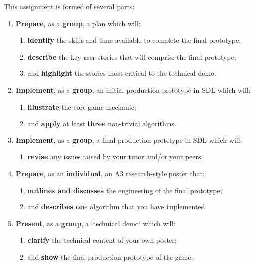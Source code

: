 \documentclass{../fal_assignment}
\begin{document}
This assignment is formed of several parts:

\begin{enumerate}[label=(\Alph*)]
    \item \textbf{Prepare}, as a \textbf{group}, a plan which will:
    	\begin{enumerate}[label=\roman*.]
    	    	\item \textbf{identify} the skills and time available to complete the final prototype;
    		\item \textbf{describe} the key user stories that will comprise the final prototype;
    		\item and \textbf{highlight} the stories most critical to the technical demo.
	\end{enumerate}
    \item \textbf{Implement}, as a \textbf{group}, an initial production prototype in SDL which will:
    	\begin{enumerate}[label=\roman*.]
    		\item \textbf{illustrate} the core game mechanic;
    		\item and \textbf{apply} at least \textbf{three} non-trivial algorithms.
	\end{enumerate}
    \item \textbf{Implement}, as a \textbf{group}, a final production prototype  in SDL which will:
    	\begin{enumerate}[label=\roman*.]
    		\item \textbf{revise} any issues raised by your tutor and/or your peers.
	\end{enumerate}
    \item \textbf{Prepare}, as an \textbf{individual}, an A3 research-style poster that:
    	\begin{enumerate}[label=\roman*.]
    		\item \textbf{outlines and discusses} the engineering of the final prototype;
    		\item and \textbf{describes one} algorithm that you have implemented. 
	\end{enumerate}
    \item \textbf{Present}, as a \textbf{group}, a `technical demo` which will:
    	\begin{enumerate}[label=\roman*.]
    		\item \textbf{clarify} the technical content of your own poster;
    		\item and \textbf{show} the final production prototype of the game.
	\end{enumerate}
\end{enumerate}
  
\end{document}
